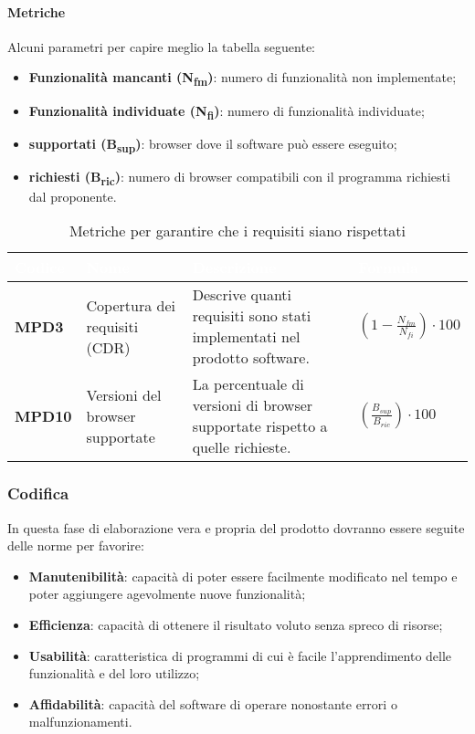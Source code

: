 \paragraph{Metriche}
Alcuni parametri per capire meglio la tabella seguente:
\begin{itemize}
\item \textbf{Funzionalità mancanti (N\textsubscript{fm})}: numero di funzionalità non implementate;
\item \textbf{Funzionalità individuate (N\textsubscript{fi})}: numero di funzionalità individuate;
\item \textbf{ supportati (B\textsubscript{sup})}: browser dove il software può essere eseguito;
	\item \textbf{ richiesti (B\textsubscript{ric})}: numero di browser compatibili con il programma richiesti dal proponente.
\end{itemize}
\renewcommand{\arraystretch}{1.5}
\renewcommand\extrarowheight{1.5pt}
\begin{longtable}{C{1.5cm} C{4.5cm} C{5.5cm} C{5cm}}
		\textcolor{white}{\textbf{Codice}} & 
		\textcolor{white}{\textbf{Nome}} & 
		\textcolor{white}{\textbf{Descrizione}} & 
		\textcolor{white}{\textbf{Formula}} \\
		\endfirsthead
	    \endfoot
	    \caption{Metriche per garantire che i requisiti siano rispettati}
	    \endlastfoot
		\hline
		\textbf{MPD3} & 
		Copertura dei requisiti (CDR) & 
		Descrive quanti requisiti sono stati implementati nel prodotto software. &
		$(1 - \frac{N_{fm}}{N_{fi}}) \cdot 100 $ \\
		\textbf{MPD10} & 
		Versioni del browser supportate & 
		La percentuale di versioni di browser supportate rispetto a quelle richieste. &
		$(\frac{B_{sup}}{B_{ric}}) \cdot 100 $  \\
\end{longtable} 
\subsubsection{Codifica}
In questa fase di elaborazione vera e propria del prodotto dovranno essere seguite delle norme per favorire:
\begin{itemize}
\item \textbf{Manutenibilità}: capacità di poter essere facilmente modificato nel tempo e poter aggiungere agevolmente nuove funzionalità;
\item \textbf{Efficienza}: capacità di ottenere il risultato voluto senza spreco di risorse;
\item \textbf{Usabilità}: caratteristica di programmi di cui è facile l'apprendimento delle funzionalità e del loro utilizzo;
\item \textbf{Affidabilità}: capacità del software di operare nonostante errori o malfunzionamenti. 
\end{itemize}
